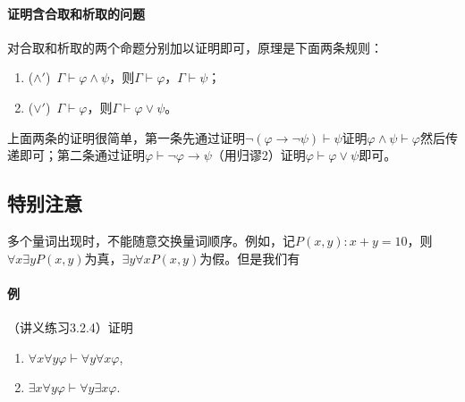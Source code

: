 \documentclass[b5paper,oneside]{ctexbook}
\begin{document}
\paragraph{证明含合取和析取的问题}对合取和析取的两个命题分别加以证明即可，原理是下面两条规则：
\begin{enumerate}
\item ($\land'$)~$\Gamma\vdash\varphi\land\psi$，则$\Gamma\vdash\varphi$，$\Gamma\vdash\psi$；
\item ($\lor'$)~$\Gamma\vdash\varphi$，则$\Gamma\vdash\varphi\lor\psi$。
\end{enumerate}
上面两条的证明很简单，第一条先通过证明$\neg(\varphi\to\neg\psi)\vdash\psi$证明$\varphi\land\psi\vdash\varphi$然后传递即可；第二条通过证明$\varphi\vdash\neg\varphi\to\psi$（用归谬2）证明$\varphi\vdash\varphi\lor\psi$即可。
\subsection{特别注意}
多个量词出现时，不能随意交换量词顺序。例如，记$P(x,y):x+y=10$，则$\forall x\exists yP(x,y)$为真，$\exists y\forall xP(x,y)$为假。但是我们有
\paragraph{例}（讲义练习3.2.4）证明
\begin{enumerate}
\item $\forall x\forall y\varphi\vdash\forall y\forall x\varphi$,
\item $\exists x\forall y\varphi\vdash\forall y\exists x\varphi$.
\end{enumerate}
\end{document}
